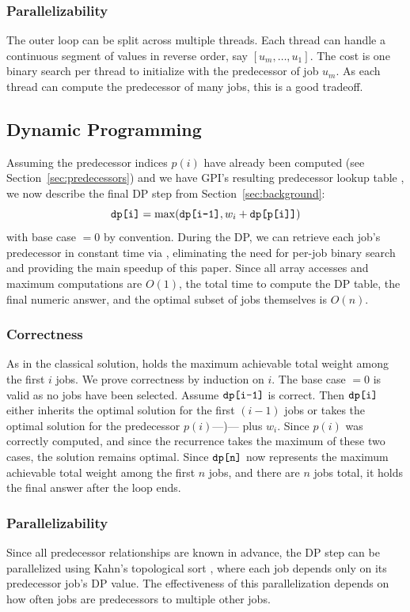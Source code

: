 \documentclass[final,5p,times]{elsarticle}
\newcommand{\code}[1]{\texttt{\detokenize{#1}}}
\begin{document}
\subsubsection*{Parallelizability}
The outer loop can be split across multiple threads. Each thread can handle a continuous segment of \code{start_index} values in reverse order, say $[u_m, \ldots, u_1]$. The cost is one binary search per thread to initialize \code{end_index} with the predecessor of job $u_m$. As each thread can compute the predecessor of many jobs, this is a good tradeoff.

\subsection{Dynamic Programming}
Assuming the predecessor indices $p(i)$ have already been computed (see Section~\ref{sec:predecessors}) and we have GPI's resulting predecessor lookup table \code{p}, we now describe the final DP step from Section~\ref{sec:background}:
\[
\code{dp[i]} = \max(\code{dp[i-1]}, w_i + \code{dp[p[i]]})
\]
with base case \code{dp[0]} $=0$ by convention. During the DP, we can retrieve each job's predecessor in constant time via \code{p}, eliminating the need for per-job binary search and providing the main speedup of this paper. Since all array accesses and maximum computations are $O(1)$, the total time to compute the DP table, the final numeric answer, and the optimal subset of jobs themselves is $O(n)$.

\subsubsection*{Correctness}

As in the classical solution, \code{dp[i]} holds the maximum achievable total weight among the first $i$ jobs. We prove correctness by induction on $i$. The base case \code{dp[0]} $=0$ is valid as no jobs have been selected. Assume $\code{dp[i-1]}$ is correct. Then $\code{dp[i]}$ either inherits the optimal solution for the first $(i-1)$ jobs or takes the optimal solution for the predecessor $p(i)$\thinspace---\code{dp[p[i]]})\thinspace--- plus $w_i$. Since $p(i)$ was correctly computed, and since the recurrence takes the maximum of these two cases, the solution remains optimal. Since $\code{dp[n]}$ now represents the maximum achievable total weight among the first $n$ jobs, and there are $n$ jobs total, it holds the final answer after the loop ends.

\subsubsection*{Parallelizability}
Since all predecessor relationships are known in advance, the DP step can be parallelized using Kahn's topological sort \cite{kahn1962}, where each job depends only on its predecessor job's DP value. The effectiveness of this parallelization depends on how often jobs are predecessors to multiple other jobs. 
\end{document}
